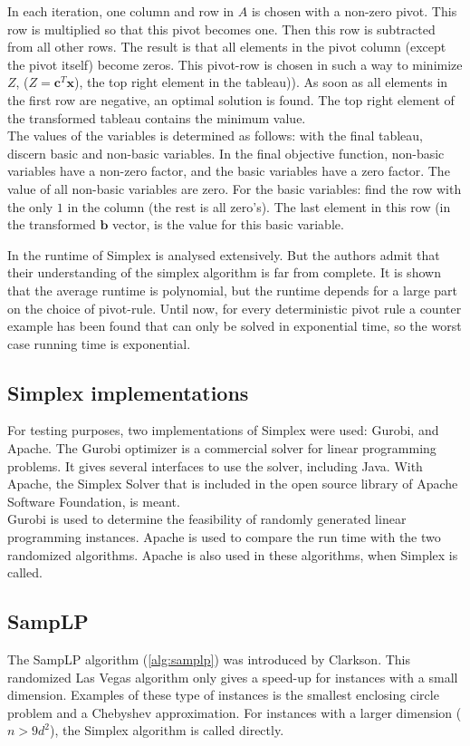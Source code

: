 \documentclass[nocopyrightspace]{acm_proc_article-sp}
\begin{document}
In each iteration, one column and row in $A$ is chosen with a non-zero pivot. This row is multiplied so that this pivot becomes one. Then this row is subtracted from all other rows. The result is that all elements in the pivot column (except the pivot itself) become zeros. This pivot-row is chosen in such a way to minimize $Z$, ($Z = \mathbf{c}^T \mathbf{x}$), the top right element in the tableau)). As soon as all elements in the first row are negative, an optimal solution is found. The top right element of the transformed tableau contains the minimum value. \\
The values of the variables is determined as follows: with the final tableau, discern basic and non-basic variables. In the final objective function, non-basic variables have a non-zero factor, and the basic variables have a zero factor. The value of all non-basic variables are zero. For the basic variables: find the row with the only $1$ in the column (the rest is all zero's). The last element in this row (in the transformed $\mathbf{b}$ vector, is the value for this basic variable.

In \cite{spielman2004smoothed} the runtime of Simplex is analysed extensively. But the authors admit that their understanding of the simplex algorithm is far from complete. It is shown that the average runtime is polynomial, but the runtime depends for a large part on the choice of pivot-rule.  Until now, for every deterministic pivot rule a counter example has been found that can only be solved in exponential time, so the worst case running time is exponential.
                         

\subsection{Simplex implementations}
For testing purposes, two implementations of Simplex were used: Gurobi, and Apache. The Gurobi optimizer is a commercial solver for linear programming problems. It gives several interfaces to use the solver, including Java. With Apache, the Simplex Solver that is included in the open source library of Apache Software Foundation, is meant.\\
Gurobi is used to determine the feasibility of randomly generated linear programming instances. Apache is used to compare the run time with the two randomized algorithms. Apache is also used in these algorithms, when Simplex is called.

\subsection{SampLP}
The SampLP algorithm (\ref{alg:samplp}) was introduced by Clarkson\cite{clarkson1988vegas}. This randomized Las Vegas algorithm only gives a speed-up for instances with a small dimension. Examples of these type of instances is the smallest enclosing circle problem and a Chebyshev approximation. For instances with a larger dimension ($n>9d^2$), the Simplex algorithm is called directly.
\end{document}
